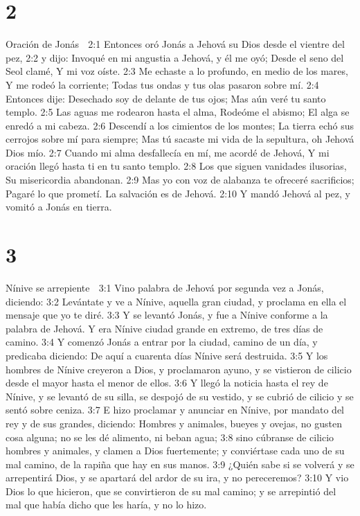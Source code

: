 \chapter{2}

Oración de Jonás  

2:1 Entonces oró Jonás a Jehová su Dios desde el vientre del pez,  
2:2 y dijo:  
Invoqué en mi angustia a Jehová, y él me oyó;  
Desde el seno del Seol clamé,  
Y mi voz oíste.  
2:3 Me echaste a lo profundo, en medio de los mares,  
Y me rodeó la corriente;  
Todas tus ondas y tus olas pasaron sobre mí.  
2:4 Entonces dije: Desechado soy de delante de tus ojos;  
Mas aún veré tu santo templo.  
2:5 Las aguas me rodearon hasta el alma,  
Rodeóme el abismo;  
El alga se enredó a mi cabeza.  
2:6 Descendí a los cimientos de los montes;  
La tierra echó sus cerrojos sobre mí para siempre;  
Mas tú sacaste mi vida de la sepultura, oh Jehová Dios mío.  
2:7 Cuando mi alma desfallecía en mí, me acordé de Jehová,  
Y mi oración llegó hasta ti en tu santo templo.  
2:8 Los que siguen vanidades ilusorias,  
Su misericordia abandonan.  
2:9 Mas yo con voz de alabanza te ofreceré sacrificios;  
Pagaré lo que prometí.  
La salvación es de Jehová.  
2:10 Y mandó Jehová al pez, y vomitó a Jonás en tierra.  

\chapter{3}

Nínive se arrepiente  

3:1 Vino palabra de Jehová por segunda vez a Jonás, diciendo:  
3:2 Levántate y ve a Nínive, aquella gran ciudad, y proclama en ella el mensaje que yo te diré.  
3:3 Y se levantó Jonás, y fue a Nínive conforme a la palabra de Jehová. Y era Nínive ciudad grande en extremo, de tres días de camino.  
3:4 Y comenzó Jonás a entrar por la ciudad, camino de un día, y predicaba diciendo: De aquí a cuarenta días Nínive será destruida.  
3:5 Y los hombres de Nínive creyeron a Dios, y proclamaron ayuno, y se vistieron de cilicio desde el mayor hasta el menor de ellos. 
3:6 Y llegó la noticia hasta el rey de Nínive, y se levantó de su silla, se despojó de su vestido, y se cubrió de cilicio y se sentó sobre ceniza.  
3:7 E hizo proclamar y anunciar en Nínive, por mandato del rey y de sus grandes, diciendo: Hombres y animales, bueyes y ovejas, no gusten cosa alguna; no se les dé alimento, ni beban agua;  
3:8 sino cúbranse de cilicio hombres y animales, y clamen a Dios fuertemente; y conviértase cada uno de su mal camino, de la rapiña que hay en sus manos.  
3:9 ¿Quién sabe si se volverá y se arrepentirá Dios, y se apartará del ardor de su ira, y no pereceremos?  
3:10 Y vio Dios lo que hicieron, que se convirtieron de su mal camino; y se arrepintió del mal que había dicho que les haría, y no lo hizo.  

